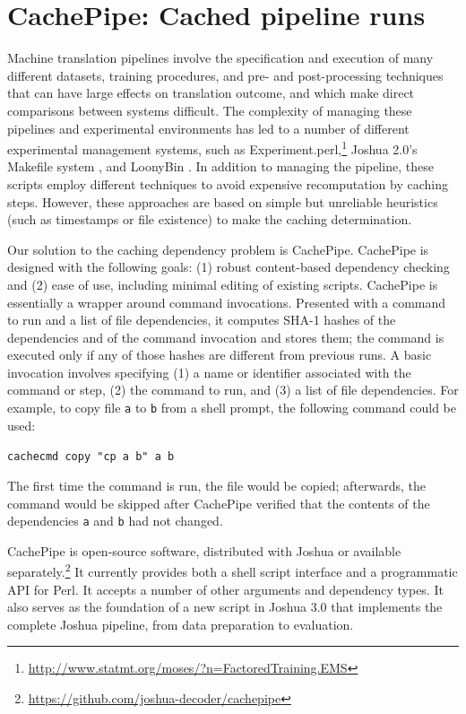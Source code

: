 \documentclass[11pt]{article}
\begin{document}
\section{CachePipe: Cached pipeline runs}

Machine translation pipelines involve the specification and execution
of many different datasets, training procedures, and pre- and
post-processing techniques that can have large effects on translation
outcome, and which make direct comparisons between systems difficult.
The complexity of managing these pipelines and experimental
environments has led to a number of different experimental management
systems, such as
Experiment.perl,\footnote{\url{http://www.statmt.org/moses/?n=FactoredTraining.EMS}}
Joshua 2.0's Makefile system \cite{li2010joshua}, and LoonyBin
\cite{clark2010loonybin}.  In addition to managing the pipeline, these
scripts employ different techniques to avoid expensive recomputation
by caching steps.  However, these
approaches are based on simple but unreliable heuristics (such as
timestamps or file existence) to make the
caching determination.

Our solution to the caching dependency problem is CachePipe.
CachePipe is designed with the following goals: (1) robust
content-based dependency checking and (2) ease of use, including
minimal editing of existing scripts.  CachePipe is essentially a
wrapper around command invocations.  Presented with a command to run
and a list of file dependencies, it computes SHA-1 hashes of the
dependencies and of the command invocation and stores them; the
command is executed only if any of those hashes are different from
previous runs.  A basic invocation involves specifying (1) a name or
identifier associated with the command or step, (2) the command to
run, and (3) a list of file dependencies.  For example, to copy file
\verb|a| to \verb|b| from a shell prompt, the following command could
be used:

\verb|cachecmd copy "cp a b" a b|

\noindent The first time the command is run, the file would be copied;
afterwards, the command would be skipped after CachePipe verified that
the contents of the dependencies \verb|a| and \verb|b| had not changed.

CachePipe is open-source software, distributed with Joshua or
available
separately.\footnote{\url{https://github.com/joshua-decoder/cachepipe}} It
currently provides both a shell script interface and a programmatic
API for Perl.  It accepts a number of other arguments and dependency
types.  It also serves as the foundation of a new script in Joshua 3.0
that implements the complete Joshua pipeline, from data preparation to
evaluation.
\end{document}
